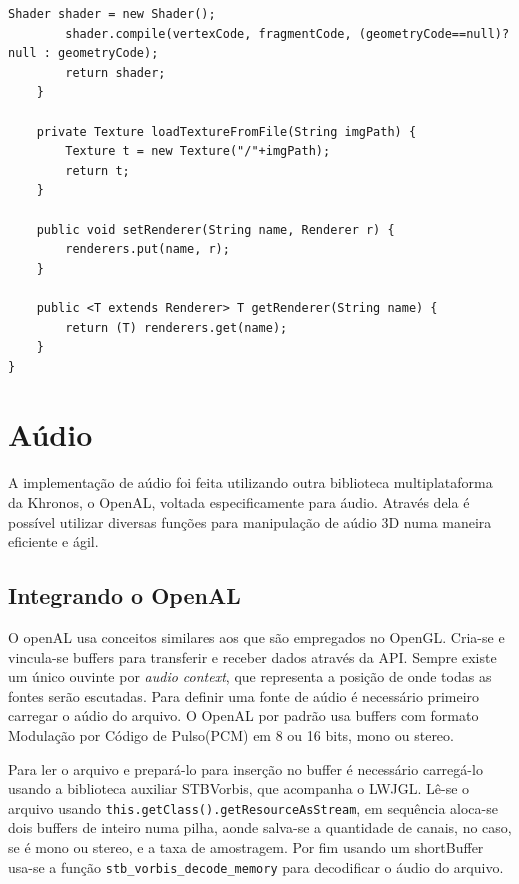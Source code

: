 \documentclass[12pt, 
openright, 
oneside, 
a4paper,    
brazil]{facom-ufu-abntex2}
\begin{document}
\begin{lstlisting}[caption=Classe Resource Manager]
        Shader shader = new Shader();
        shader.compile(vertexCode, fragmentCode, (geometryCode==null)? null : geometryCode);
        return shader;
    }
     
    private Texture loadTextureFromFile(String imgPath) {
        Texture t = new Texture("/"+imgPath); 
        return t;
    }
     
    public void setRenderer(String name, Renderer r) {
        renderers.put(name, r);
    }
     
    public <T extends Renderer> T getRenderer(String name) {
        return (T) renderers.get(name);
    }
}
\end{lstlisting}

\section{Aúdio}
A implementação de aúdio foi feita utilizando outra biblioteca multiplataforma da Khronos, o OpenAL, voltada especificamente para áudio. Através dela é possível utilizar diversas funções para manipulação de aúdio 3D numa maneira eficiente e ágil. 

\subsection{Integrando o OpenAL}
O openAL usa conceitos similares aos que são empregados no OpenGL. Cria-se e vincula-se buffers para transferir e receber dados através da API.
Sempre existe um único ouvinte por \textit{audio context}, que representa a posição de onde todas as fontes serão escutadas. Para definir uma fonte de aúdio é necessário primeiro carregar o aúdio do arquivo. O OpenAL por padrão usa buffers com formato Modulação por Código de Pulso(PCM) em 8 ou 16 bits, mono ou stereo.

Para ler o arquivo e prepará-lo para inserção no buffer é necessário carregá-lo usando a biblioteca auxiliar STBVorbis, que acompanha o LWJGL.
Lê-se o arquivo usando \texttt{this.getClass().getResourceAsStream}, em sequência aloca-se dois buffers de inteiro numa pilha, aonde salva-se a quantidade de canais, no caso, se é mono ou stereo, e a taxa de amostragem.
Por fim usando um shortBuffer usa-se a função \texttt{stb_vorbis_decode_memory} para decodificar o áudio do arquivo.
\end{document}
